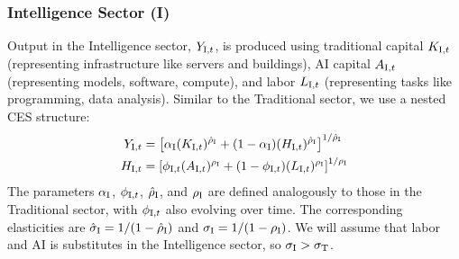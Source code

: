 \documentclass{article}
\newcommand{\sector}[1]{\textnormal{#1}}
\begin{document}
\subsubsection{Intelligence Sector (I)}
Output in the Intelligence sector, $Y_{\sector{I},t}$, is produced using traditional capital $K_{\sector{I},t}$ (representing infrastructure like servers and buildings), AI capital $A_{\sector{I},t}$ (representing models, software, compute), and labor $L_{\sector{I},t}$ (representing tasks like programming, data analysis). 
Similar to the Traditional sector, we use a nested CES structure:
\begin{align}
Y_{\sector{I},t} &= \left[ \alpha_{\sector{I}} (K_{\sector{I},t})^{\hat{\rho}_{\sector{I}}} + (1-\alpha_{\sector{I}}) (H_{\sector{I},t})^{\hat{\rho}_{\sector{I}}} \right]^{1/\hat{\rho}_{\sector{I}}} \label{eq:prod_I_outer} \\
H_{\sector{I},t} &= \left[ \phi_{\sector{I},t} (A_{\sector{I},t})^{\rho_{\sector{I}}} + (1-\phi_{\sector{I},t}) (L_{\sector{I},t})^{\rho_{\sector{I}}} \right]^{1/\rho_{\sector{I}}} \label{eq:prod_I_inner}
\end{align}
The parameters $\alpha_{\sector{I}}$, $\phi_{\sector{I},t}$, $\hat{\rho}_{\sector{I}}$, and $\rho_{\sector{I}}$ are defined analogously to those in the Traditional sector, with $\phi_{\sector{I},t}$ also evolving over time. 
The corresponding elasticities are $\hat{\sigma}_{\sector{I}} = 1/(1-\hat{\rho}_{\sector{I}})$ and $\sigma_{\sector{I}} = 1/(1-\rho_{\sector{I}})$. 
We will assume that labor and AI is substitutes in the Intelligence sector, so $\sigma_{\sector{I}} > \sigma_{\sector{T}}$.
\end{document}
